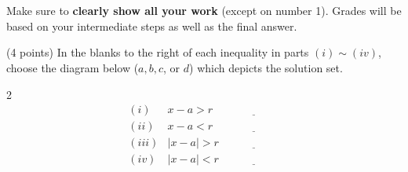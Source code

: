 \documentclass {article}
\newenvironment{prob}[2][]{\begin{trivlist}
\item[\hskip \labelsep {\bfseries #1}\hskip \labelsep {\bfseries #2.}]}{\end{trivlist}}
\begin{document}
\ \\ \\ \relax
\noindent Make sure to \textbf{clearly show all your work} (except on number 1). Grades will be based on your intermediate steps
as well as the final answer.

\vspace {1cm}

\begin {prob}{1} (4 points)
    In the blanks to the right of each inequality in parts $(i) \sim (iv)$, choose the diagram below ($a,b,c$, or $d$)
    which depicts the solution set.
    \begin {multicols}{2}
        \[ \begin {array}{rcc}
            (i)   &  x - a  > r & \underline{\hspace{2cm}} \\ [3ex]
            (ii)  & x - a   < r & \underline{\hspace{2cm}} \\ [3ex]
            (iii) & |x - a| > r & \underline{\hspace{2cm}} \\ [3ex]
            (iv)  & |x - a| < r & \underline{\hspace{2cm}} 
        \end {array} \]

        \vfill

        \begin {center}
        \end {center}
    \end {multicols}
\end {prob}
\end{document}

